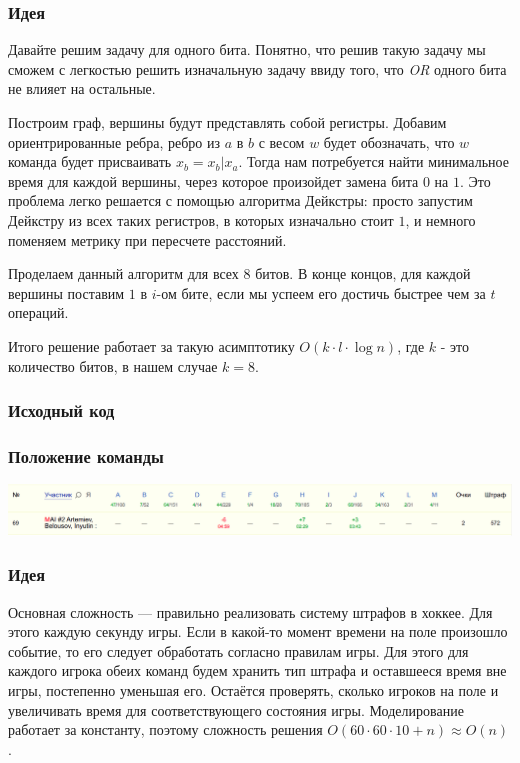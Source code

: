 \subsubsection*{Идея}
Давайте решим задачу для одного бита. Понятно, что решив такую задачу мы сможем с легкостью решить изначальную задачу ввиду того, что \textit{OR} одного бита не влияет на остальные.

Построим граф, вершины будут представлять собой регистры. Добавим ориентрированные ребра, ребро из $a$ в $b$ с весом $w$ будет обозначать, что $w$ команда будет присваивать $x_b = x_b | x_a$. Тогда нам потребуется найти минимальное время для каждой вершины, через которое произойдет замена бита $0$ на $1$. Это проблема легко решается с помощью алгоритма Дейкстры: просто запустим Дейкстру из всех таких регистров, в которых изначально стоит $1$, и немного поменяем метрику при пересчете расстояний.

Проделаем данный алгоритм для всех $8$ битов. В конце концов, для каждой вершины поставим $1$ в $i$-ом бите, если мы успеем его достичь быстрее чем за $t$ операций.

Итого решение работает за такую асимптотику $O(k \cdot l \cdot \log{n})$, где $k$ - это количество битов, в нашем случае $k = 8$.

\subsubsection*{Исходный код}

\subsubsection*{Положение команды}
\includegraphics[scale=0.25]{images/gp_korea.png}\newline\noindent
\pagebreak


\subsubsection*{Идея}
Основная сложность --- правильно реализовать систему штрафов в хоккее. Для этого каждую секунду игры. Если в какой-то момент времени на поле произошло событие, то его следует обработать согласно правилам игры. Для этого для каждого игрока обеих команд будем хранить тип штрафа и оставшееся время вне игры, постепенно уменьшая его. Остаётся проверять, сколько игроков на поле и увеличивать время для соответствующего состояния игры. Моделирование работает за константу, поэтому сложность решения $O(60 \cdot 60 \cdot 10 + n) \approx O(n)$.


